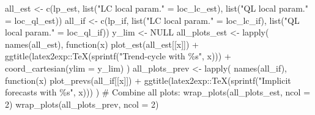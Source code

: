 \documentclass[
]{article}
\newenvironment{Shaded}{\begin{snugshade}}{\end{snugshade}}
\newcommand{\AttributeTok}[1]{\textcolor[rgb]{0.40,0.45,0.13}{#1}}
\newcommand{\CommentTok}[1]{\textcolor[rgb]{0.37,0.37,0.37}{#1}}
\newcommand{\ConstantTok}[1]{\textcolor[rgb]{0.56,0.35,0.01}{#1}}
\newcommand{\ControlFlowTok}[1]{\textcolor[rgb]{0.00,0.23,0.31}{#1}}
\newcommand{\DecValTok}[1]{\textcolor[rgb]{0.68,0.00,0.00}{#1}}
\newcommand{\FunctionTok}[1]{\textcolor[rgb]{0.28,0.35,0.67}{#1}}
\newcommand{\NormalTok}[1]{\textcolor[rgb]{0.00,0.23,0.31}{#1}}
\newcommand{\OtherTok}[1]{\textcolor[rgb]{0.00,0.23,0.31}{#1}}
\newcommand{\SpecialCharTok}[1]{\textcolor[rgb]{0.37,0.37,0.37}{#1}}
\newcommand{\StringTok}[1]{\textcolor[rgb]{0.13,0.47,0.30}{#1}}
\newcommand\1{\mathds{1}}
\begin{document}
\begin{Shaded}
\begin{Highlighting}[]
\NormalTok{all\_est }\OtherTok{\textless{}{-}} \FunctionTok{c}\NormalTok{(lp\_est, }\FunctionTok{list}\NormalTok{(}\StringTok{"LC local param."} \OtherTok{=}\NormalTok{ loc\_lc\_est),}
             \FunctionTok{list}\NormalTok{(}\StringTok{"QL local param."} \OtherTok{=}\NormalTok{ loc\_ql\_est))}
\NormalTok{all\_if }\OtherTok{\textless{}{-}} \FunctionTok{c}\NormalTok{(lp\_if, }\FunctionTok{list}\NormalTok{(}\StringTok{"LC local param."} \OtherTok{=}\NormalTok{ loc\_lc\_if),}
            \FunctionTok{list}\NormalTok{(}\StringTok{"QL local param."} \OtherTok{=}\NormalTok{ loc\_ql\_if))}
\NormalTok{y\_lim }\OtherTok{\textless{}{-}} \ConstantTok{NULL}
\NormalTok{all\_plots\_est }\OtherTok{\textless{}{-}} \FunctionTok{lapply}\NormalTok{(}
  \FunctionTok{names}\NormalTok{(all\_est),}
  \ControlFlowTok{function}\NormalTok{(x) }\FunctionTok{plot\_est}\NormalTok{(all\_est[[x]]) }\SpecialCharTok{+}
    \FunctionTok{ggtitle}\NormalTok{(latex2exp}\SpecialCharTok{::}\FunctionTok{TeX}\NormalTok{(}\FunctionTok{sprintf}\NormalTok{(}\StringTok{"Trend{-}cycle with \%s"}\NormalTok{, x))) }\SpecialCharTok{+}
    \FunctionTok{coord\_cartesian}\NormalTok{(}\AttributeTok{ylim =}\NormalTok{ y\_lim)}
\NormalTok{)}
\NormalTok{all\_plots\_prev }\OtherTok{\textless{}{-}} \FunctionTok{lapply}\NormalTok{(}
  \FunctionTok{names}\NormalTok{(all\_if),}
  \ControlFlowTok{function}\NormalTok{(x) }\FunctionTok{plot\_prevs}\NormalTok{(all\_if[[x]]) }\SpecialCharTok{+}
    \FunctionTok{ggtitle}\NormalTok{(latex2exp}\SpecialCharTok{::}\FunctionTok{TeX}\NormalTok{(}\FunctionTok{sprintf}\NormalTok{(}\StringTok{"Implicit forecasts with \%s"}\NormalTok{, x)))}
\NormalTok{)}
\CommentTok{\# Combine all plots:}
\FunctionTok{wrap\_plots}\NormalTok{(all\_plots\_est, }\AttributeTok{ncol =} \DecValTok{2}\NormalTok{)}
\FunctionTok{wrap\_plots}\NormalTok{(all\_plots\_prev, }\AttributeTok{ncol =} \DecValTok{2}\NormalTok{)}
\end{Highlighting}
\end{Shaded}
\end{document}
